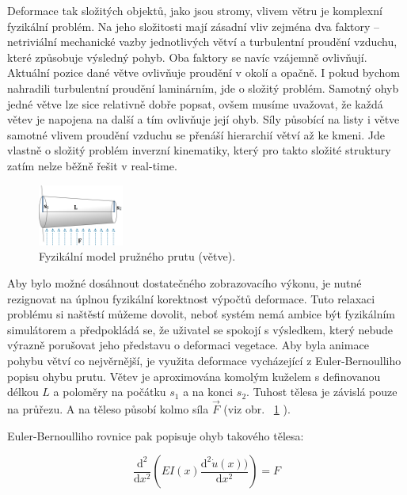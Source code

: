 Deformace tak složitých objektů, jako jsou stromy, vlivem větru je komplexní fyzikální problém. Na jeho složitosti mají zásadní vliv zejména dva faktory – netriviální mechanické vazby jednotlivých větví a turbulentní proudění vzduchu, které způsobuje výsledný pohyb. Oba faktory se navíc vzájemně ovlivňují. Aktuální pozice dané větve ovlivňuje proudění v okolí a opačně. I pokud bychom nahradili turbulentní proudění laminárním, jde o složitý problém. Samotný ohyb jedné větve lze sice relativně dobře popsat, ovšem musíme uvažovat, že každá větev je napojena na další a tím ovlivňuje její ohyb. Síly působící na listy i větve samotné vlivem proudění vzduchu se přenáší hierarchií větví až ke kmeni. Jde vlastně o složitý problém inverzní kinematiky, který pro takto složité struktury zatím nelze běžně řešit v real-time. 
\begin{figure}[!hbt]
\begin{center}
\includegraphics[width=0.25\textwidth]{./figures/branchBeamModel.png}
\end{center}
\caption{Fyzikální model pružného prutu (větve).
\label{fig:branchBeamModel}
}
\end{figure}

Aby bylo možné dosáhnout dostatečného zobrazovacího výkonu, je nutné rezignovat na úplnou fyzikální korektnost výpočtů deformace. Tuto relaxaci problému si naštěstí můžeme dovolit, neboť systém nemá ambice být fyzikálním simulátorem a předpokládá se, že uživatel se spokojí s výsledkem, který nebude výrazně porušovat jeho představu o deformaci vegetace.
Aby byla animace pohybu větví co nejvěrnější, je využita deformace vycházející z Euler-Bernoulliho popisu ohybu prutu. Větev je aproximována komolým kuželem s definovanou délkou $L$ a poloměry na počátku $s_1$ a na konci $s_2$. Tuhost tělesa je závislá pouze na průřezu. A na těleso působí kolmo síla $\vec{F}$ (viz obr. ~\ref{fig:branchBeamModel} ).

Euler-Bernoulliho rovnice pak popisuje ohyb takového tělesa:

\begin{equation}
\frac{\mathrm{d}^2 }{\mathrm{d} x^2}(EI(x)\frac{\mathrm{d}^2 \dot{u} (x))}{\mathrm{d} x^2} ) = F
\end{equation}


